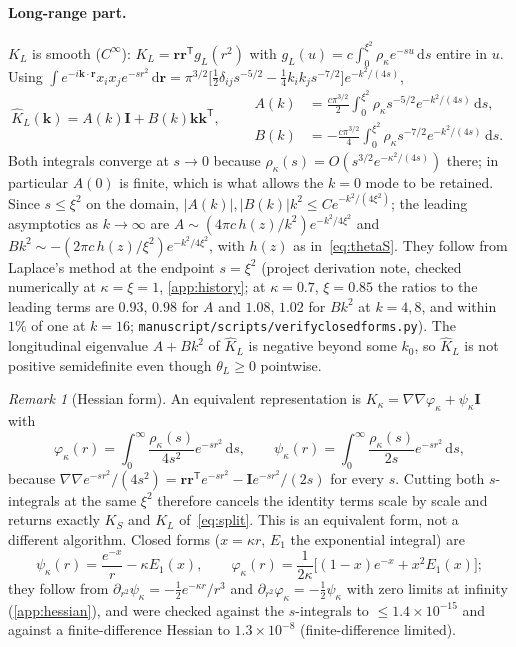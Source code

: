 \documentclass[11pt]{article}
\DeclareRobustCommand{\_}{\textunderscore\allowbreak}
\theoremstyle{remark}
\newtheorem{remark}[proposition]{Remark}
\theoremstyle{definition}
\newcommand{\br}{\mathbf{r}}
\newcommand{\bk}{\mathbf{k}}
\newcommand{\Id}{\mathbf{I}}
\newcommand{\dd}{\,\mathrm{d}}
\begin{document}
\paragraph{Long-range part.}
$K_L$ is smooth ($C^\infty$): $K_L=\br\br^{\mathsf T}g_L(r^2)$ with $g_L(u)=c\int_0^{\xi^2}\rho_\kappa e^{-su}\dd s$
entire in $u$. Using
$\int e^{-i\bk\cdot\br}x_ix_je^{-sr^2}\dd\br=\pi^{3/2}\big[\tfrac12\delta_{ij}s^{-5/2}-\tfrac14k_ik_js^{-7/2}\big]e^{-k^2/(4s)}$,
\begin{equation}\label{eq:AB}
\hat K_L(\bk)=A(k)\Id+B(k)\bk\bk^{\mathsf T},\qquad
\begin{aligned}A(k)&=\frac{c\pi^{3/2}}{2}\int_0^{\xi^2}\rho_\kappa s^{-5/2}e^{-k^2/(4s)}\dd s,\\
B(k)&=-\frac{c\pi^{3/2}}{4}\int_0^{\xi^2}\rho_\kappa s^{-7/2}e^{-k^2/(4s)}\dd s .\end{aligned}
\end{equation}
Both integrals converge at $s\to0$ because $\rho_\kappa(s)=O(s^{3/2}e^{-\kappa^2/(4s)})$ there; in particular
$A(0)$ is finite, which is what allows the $k=0$ mode to be retained. Since $s\le\xi^2$ on the domain,
$|A(k)|,|B(k)|k^2\le C e^{-k^2/(4\xi^2)}$; the leading asymptotics as $k\to\infty$ are
$A\sim(4\pi c\,h(z)/k^2)e^{-k^2/4\xi^2}$ and $Bk^2\sim-(2\pi c\,h(z)/\xi^2)e^{-k^2/4\xi^2}$, with $h(z)$ as
in~\eqref{eq:thetaS}. They follow from Laplace's method at the endpoint $s=\xi^2$ (project derivation note, checked
numerically at $\kappa=\xi=1$, \cref{app:history}; at $\kappa=0.7$, $\xi=0.85$ the ratios to the leading terms are
$0.93$, $0.98$ for $A$ and $1.08$, $1.02$ for $Bk^2$ at $k=4,8$, and within $1\%$ of one at $k=16$;
\texttt{manuscript/scripts/verify\_closed\_forms.py}). The longitudinal eigenvalue
$A+Bk^2$ of $\hat K_L$ is negative beyond some $k_0$, so $\hat K_L$ is not positive semidefinite even though
$\theta_L\ge0$ pointwise.

\begin{remark}[Hessian form]\label{rem:hessian}
An equivalent representation is $K_\kappa=\nabla\nabla\varphi_\kappa+\psi_\kappa\Id$ with
\[
\varphi_\kappa(r)=\int_0^\infty\frac{\rho_\kappa(s)}{4s^2}e^{-sr^2}\dd s,\qquad
\psi_\kappa(r)=\int_0^\infty\frac{\rho_\kappa(s)}{2s}e^{-sr^2}\dd s,
\]
because $\nabla\nabla e^{-sr^2}/(4s^2)=\br\br^{\mathsf T}e^{-sr^2}-\Id e^{-sr^2}/(2s)$ for every $s$. Cutting both
$s$-integrals at the same $\xi^2$ therefore cancels the identity terms scale by scale and returns exactly $K_S$ and
$K_L$ of~\eqref{eq:split}. This is an equivalent form, not a different algorithm. Closed forms
($x=\kappa r$, $E_1$ the exponential integral) are
\[
\psi_\kappa(r)=\frac{e^{-x}}{r}-\kappa E_1(x),\qquad
\varphi_\kappa(r)=\frac{1}{2\kappa}\big[(1-x)e^{-x}+x^2E_1(x)\big];
\]
they follow from $\partial_{r^2}\psi_\kappa=-\tfrac12e^{-\kappa r}/r^3$ and $\partial_{r^2}\varphi_\kappa=-\tfrac12\psi_\kappa$
with zero limits at infinity (\cref{app:hessian}), and were checked against the $s$-integrals to $\le1.4\times10^{-15}$
and against a finite-difference Hessian to $1.3\times10^{-8}$ (finite-difference limited).
\end{remark}
\end{document}
